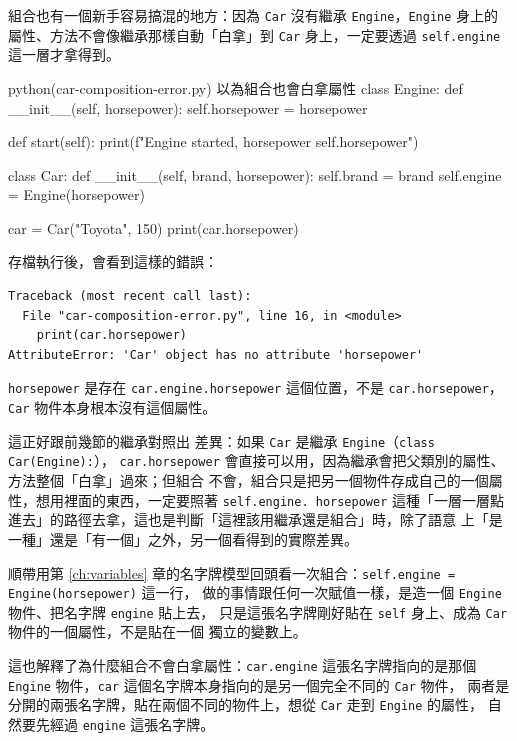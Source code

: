 組合也有一個新手容易搞混的地方：因為 \texttt{Car} 沒有繼承 \texttt{Engine}，\texttt{Engine}
身上的屬性、方法不會像繼承那樣自動「白拿」到 \texttt{Car} 身上，一定要透過 \texttt{self.engine}
這一層才拿得到。

\begin{example}{python}{(car-composition-error.py) 以為組合也會白拿屬性}
class Engine:
    def __init__(self, horsepower):
        self.horsepower = horsepower

    def start(self):
        print(f"Engine started, horsepower {self.horsepower}")


class Car:
    def __init__(self, brand, horsepower):
        self.brand = brand
        self.engine = Engine(horsepower)


car = Car("Toyota", 150)
print(car.horsepower)
\end{example}

存檔執行後，會看到這樣的錯誤：

\begin{verbatim}
Traceback (most recent call last):
  File "car-composition-error.py", line 16, in <module>
    print(car.horsepower)
AttributeError: 'Car' object has no attribute 'horsepower'
\end{verbatim}

\texttt{horsepower} 是存在 \texttt{car.engine.horsepower} 這個位置，不是
\texttt{car.horsepower}，\texttt{Car} 物件本身根本沒有這個屬性。

這正好跟前幾節的繼承對照出
差異：如果 \texttt{Car} 是繼承 \texttt{Engine}（\texttt{class Car(Engine):}），
\texttt{car.horsepower} 會直接可以用，因為繼承會把父類別的屬性、方法整個「白拿」過來；但組合
不會，組合只是把另一個物件存成自己的一個屬性，想用裡面的東西，一定要照著 \texttt{self.engine.
horsepower} 這種「一層一層點進去」的路徑去拿，這也是判斷「這裡該用繼承還是組合」時，除了語意
上「是一種」還是「有一個」之外，另一個看得到的實際差異。

順帶用第 \ref{ch:variables} 章的名字牌模型回頭看一次組合：\texttt{self.engine = Engine(horsepower)} 這一行，
做的事情跟任何一次賦值一樣，是造一個 \texttt{Engine} 物件、把名字牌 \texttt{engine} 貼上去，
只是這張名字牌剛好貼在 \texttt{self} 身上、成為 \texttt{Car} 物件的一個屬性，不是貼在一個
獨立的變數上。

這也解釋了為什麼組合不會白拿屬性：\texttt{car.engine} 這張名字牌指向的是那個
\texttt{Engine} 物件，\texttt{car} 這個名字牌本身指向的是另一個完全不同的 \texttt{Car} 物件，
兩者是分開的兩張名字牌，貼在兩個不同的物件上，想從 \texttt{Car} 走到 \texttt{Engine} 的屬性，
自然要先經過 \texttt{engine} 這張名字牌。

